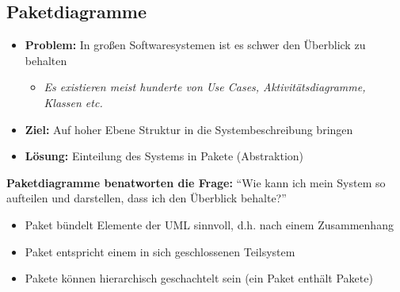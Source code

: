 \documentclass[11pt, a4paper]{article}
\begin{document}
\raggedright \subsection{Paketdiagramme}

\begin{itemize}
    \item \textbf{Problem:} In großen Softwaresystemen ist es schwer den Überblick zu behalten
    \begin{itemize}
        \item \textit{Es existieren meist hunderte von Use Cases, Aktivitätsdiagramme, Klassen etc.}
    \end{itemize}
    \item \textbf{Ziel:} Auf hoher Ebene Struktur in die Systembeschreibung bringen
    \item \textbf{Lösung:} Einteilung des Systems in Pakete (Abstraktion)
\end{itemize}

\textbf{Paketdiagramme benatworten die Frage:} “Wie kann ich mein System so aufteilen und darstellen, dass ich den Überblick behalte?”

\begin{itemize}
    \item Paket bündelt Elemente der UML sinnvoll, d.h. nach einem Zusammenhang
    \item Paket entspricht einem in sich geschlossenen Teilsystem
    \item Pakete können hierarchisch geschachtelt sein (ein Paket enthält Pakete)
\end{itemize}
\end{document}
